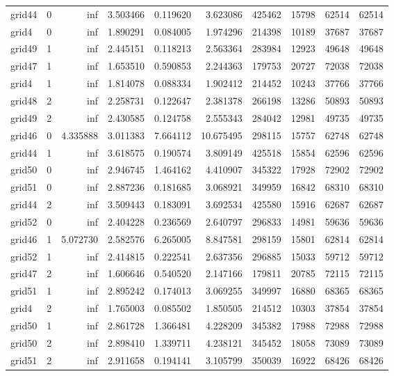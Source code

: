 \begin{longtable}{|l|r|r|r|r|r|r|r|r|r|}
grid44 & 0 & inf & 3.503466 & 0.119620 & 3.623086 & 425462 & 15798 & 62514 & 62514 \\
grid4 & 0 & inf & 1.890291 & 0.084005 & 1.974296 & 214398 & 10189 & 37687 & 37687 \\
grid49 & 1 & inf & 2.445151 & 0.118213 & 2.563364 & 283984 & 12923 & 49648 & 49648 \\
grid47 & 1 & inf & 1.653510 & 0.590853 & 2.244363 & 179753 & 20727 & 72038 & 72038 \\
grid4 & 1 & inf & 1.814078 & 0.088334 & 1.902412 & 214452 & 10243 & 37766 & 37766 \\
grid48 & 2 & inf & 2.258731 & 0.122647 & 2.381378 & 266198 & 13286 & 50893 & 50893 \\
grid49 & 2 & inf & 2.430585 & 0.124758 & 2.555343 & 284042 & 12981 & 49735 & 49735 \\
grid46 & 0 & 4.335888 & 3.011383 & 7.664112 & 10.675495 & 298115 & 15757 & 62748 & 62748 \\
grid44 & 1 & inf & 3.618575 & 0.190574 & 3.809149 & 425518 & 15854 & 62596 & 62596 \\
grid50 & 0 & inf & 2.946745 & 1.464162 & 4.410907 & 345322 & 17928 & 72902 & 72902 \\
grid51 & 0 & inf & 2.887236 & 0.181685 & 3.068921 & 349959 & 16842 & 68310 & 68310 \\
grid44 & 2 & inf & 3.509443 & 0.183091 & 3.692534 & 425580 & 15916 & 62687 & 62687 \\
grid52 & 0 & inf & 2.404228 & 0.236569 & 2.640797 & 296833 & 14981 & 59636 & 59636 \\
grid46 & 1 & 5.072730 & 2.582576 & 6.265005 & 8.847581 & 298159 & 15801 & 62814 & 62814 \\
grid52 & 1 & inf & 2.414815 & 0.222541 & 2.637356 & 296885 & 15033 & 59712 & 59712 \\
grid47 & 2 & inf & 1.606646 & 0.540520 & 2.147166 & 179811 & 20785 & 72115 & 72115 \\
grid51 & 1 & inf & 2.895242 & 0.174013 & 3.069255 & 349997 & 16880 & 68365 & 68365 \\
grid4 & 2 & inf & 1.765003 & 0.085502 & 1.850505 & 214512 & 10303 & 37854 & 37854 \\
grid50 & 1 & inf & 2.861728 & 1.366481 & 4.228209 & 345382 & 17988 & 72988 & 72988 \\
grid50 & 2 & inf & 2.898410 & 1.339711 & 4.238121 & 345452 & 18058 & 73089 & 73089 \\
grid51 & 2 & inf & 2.911658 & 0.194141 & 3.105799 & 350039 & 16922 & 68426 & 68426 \\

\end{longtable}

